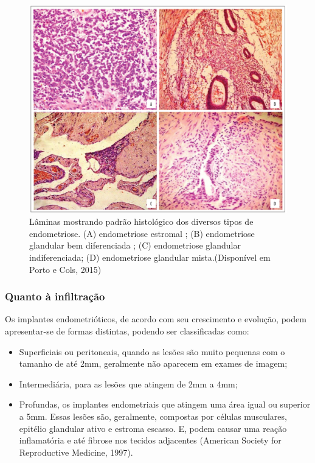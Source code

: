 \documentclass[12pt]{article} %
\begin{document}
\begin{figure}[h!]
\centering
\includegraphics[width=16cm]{citoendometriose1636.jpg}
\caption[Amostras histológicas de diversos tipos de endometriose]{Lâminas mostrando padrão histológico dos diversos tipos de endometriose. (A) endometriose estromal ; (B) endometriose glandular bem diferenciada ; (C) endometriose glandular indiferenciada; (D) endometriose glandular mista.(Disponível em Porto e Cols, 2015)}
\label{histologico}
\end{figure} 


\subsubsection{Quanto à infiltração}

Os implantes endometrióticos, de acordo com seu crescimento e evolução,
podem apresentar-se de formas distintas, podendo ser classificadas
como:
\begin{itemize}

\item Superficiais ou peritoneais, quando as lesões são muito pequenas
com o tamanho de até 2mm, geralmente não aparecem em exames de imagem;
\item Intermediária, para as lesões que atingem de 2mm a 4mm; 
\item Profundas, os implantes endometriais que atingem uma área igual ou superior a 5mm.
Essas lesões são, geralmente, compostas por células musculares,
epitélio glandular ativo e estroma escasso. E, podem causar uma reação
inflamatória e até fibrose nos tecidos adjacentes (American Society
for Reproductive Medicine, 1997).
\end{itemize}
\end{document}
